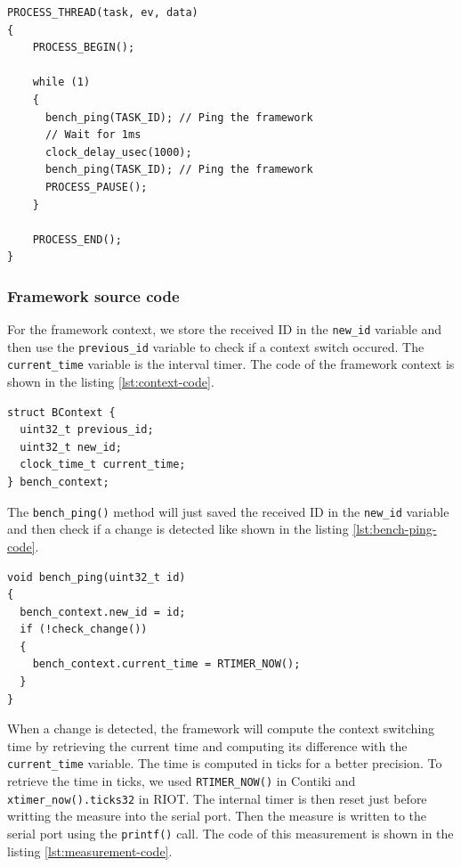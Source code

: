 \begin{lstlisting}[float, style=CStyle, label={lst:bench-task-code}, caption={source code of the application task with \texttt{bench\_ping()} calls}]
PROCESS_THREAD(task, ev, data)
{
    PROCESS_BEGIN();

    while (1)
    {
      bench_ping(TASK_ID); // Ping the framework
      // Wait for 1ms
      clock_delay_usec(1000);
      bench_ping(TASK_ID); // Ping the framework
      PROCESS_PAUSE();
    }

    PROCESS_END();
}
\end{lstlisting}

\subsubsection{Framework source code}

For the framework context, we store the received ID in the \texttt{new\_id} variable 
  and then use the \texttt{previous\_id} variable to check if a context switch occured.
The \texttt{current\_time} variable is the interval timer.
The code of the framework context is shown in the listing \ref{lst:context-code}.

\begin{lstlisting}[style=CStyle, float, label={lst:context-code}, caption={framework context implementation}]
struct BContext {
  uint32_t previous_id;
  uint32_t new_id;
  clock_time_t current_time;
} bench_context;
\end{lstlisting}

The \texttt{bench\_ping()} method will just saved the received ID in the \texttt{new\_id} variable 
  and then check if a change is detected like shown in the listing \ref{lst:bench-ping-code}.

\begin{lstlisting}[style=CStyle, float, label={lst:bench-ping-code}, caption={\texttt{bench\_ping()} implementation}]
void bench_ping(uint32_t id)
{
  bench_context.new_id = id;
  if (!check_change())
  {
    bench_context.current_time = RTIMER_NOW();
  }
}
\end{lstlisting}

When a change is detected, the framework will compute the context switching time 
  by retrieving the current time and computing its difference with the \texttt{current\_time} variable.
The time is computed in ticks for a better precision.
To retrieve the time in ticks, we used \texttt{RTIMER\_NOW()} in Contiki and \texttt{xtimer\_now().ticks32} in RIOT.
The internal timer is then reset just before writting the measure into the serial port.
Then the measure is written to the serial port using the \texttt{printf()} call.
The code of this measurement is shown in the listing \ref{lst:measurement-code}.

